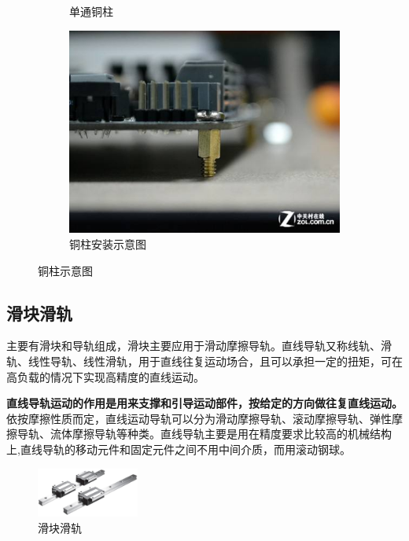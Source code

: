 \documentclass[UTF8]{article} %
\begin{document}
\begin{figure}[H]
\begin{subfigure}[b]{0.21\textwidth}
          \caption{单通铜柱}
  \end{subfigure}
  \quad
  \begin{subfigure}[b]{0.28\textwidth}
          \centering
          \includegraphics[width=\textwidth]{tong3.png}
          \caption{铜柱安装示意图}
  \end{subfigure}
  \caption{铜柱示意图}
\end{figure}

\subsection{滑块滑轨}
主要有滑块和导轨组成，滑块主要应用于滑动摩擦导轨。直线导轨又称线轨、滑轨、线性导轨、线性滑轨，用于直线往复运动场合，且可以承担一定的扭矩，可在高负载的情况下实现高精度的直线运动。

\textbf{直线导轨运动的作用是用来支撑和引导运动部件，按给定的方向做往复直线运动。}依按摩擦性质而定，直线运动导轨可以分为滑动摩擦导轨、滚动摩擦导轨、弹性摩擦导轨、流体摩擦导轨等种类。直线导轨主要是用在精度要求比较高的机械结构上,直线导轨的移动元件和固定元件之间不用中间介质，而用滚动钢球。

\begin{figure}[h]
  \centering
  \includegraphics[width=0.3\textwidth]{hua.png}
  \caption{滑块滑轨}
\end{figure}
\end{document}
